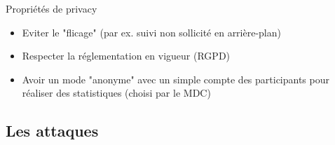 \documentclass[aspectratio=169]{beamer}
\begin{document}
\begin{frame}{Propriétés de privacy}
    \begin{itemize}
        \item Eviter le "flicage" (par ex. suivi non sollicité en arrière-plan)\pause
        \item Respecter la réglementation en vigueur (RGPD)\pause
        \item Avoir un mode "anonyme" avec un simple compte des participants pour réaliser des statistiques (choisi par le MDC)
    \end{itemize}
\end{frame}

\subsection{Les attaques}
\end{document}
